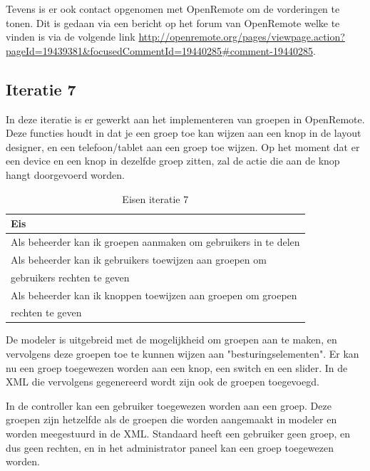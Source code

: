 \documentclass[]{article}
\begin{document}
Tevens is er ook contact opgenomen met OpenRemote om de vorderingen te tonen.
Dit is gedaan via een bericht op het forum van OpenRemote welke te vinden is via
de volgende link 
\url{http://openremote.org/pages/viewpage.action?pageId=19439381&focusedCommentId=19440285#comment-19440285}. 
 
\subsection{Iteratie 7}

In deze iteratie is er gewerkt aan het implementeren van groepen in OpenRemote.
Deze functies houdt in dat je een groep toe kan wijzen aan een knop in de layout
designer, en een telefoon/tablet aan een groep toe wijzen. Op het moment dat er
een device en een knop in dezelfde groep zitten, zal de actie die aan de knop
hangt doorgevoerd worden.

\begin{table}[htpb]
  \caption{Eisen iteratie 7}
  \begin{center}
    \begin{tabular}{|| l ||}\hline
        Eis                                                              \\\hline\hline
        Als beheerder kan ik groepen aanmaken om gebruikers in te delen  \\\hline
        Als beheerder kan ik gebruikers toewijzen aan groepen om         \\ 
        gebruikers rechten te geven                                      \\\hline
        Als beheerder kan ik knoppen toewijzen aan groepen om groepen    \\ 
        rechten te geven                                                 \\\hline
    \end{tabular}
  \end{center}
\end{table}

De modeler is uitgebreid met de mogelijkheid om groepen aan te maken, en
vervolgens deze groepen toe te kunnen wijzen aan "besturingselementen". Er kan
nu een groep toegewezen worden aan een knop, een switch en een slider. In de XML
die vervolgens gegenereerd wordt zijn ook de groepen toegevoegd. 

In de controller kan een gebruiker toegewezen worden aan een groep. Deze groepen
zijn hetzelfde als de groepen die worden aangemaakt in modeler en worden
meegestuurd in de XML. Standaard heeft een gebruiker geen groep, en dus geen
rechten, en in het administrator paneel kan een groep toegewezen worden.
\end{document}
